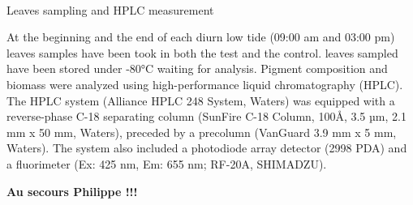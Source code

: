 \documentclass[
  number]{elsarticle}
\makeatletter
\let\oldparagraph\paragraph
\renewcommand{\paragraph}{
    \@ifstar
      \xxxParagraphStar
      \xxxParagraphNoStar
  }
\newcommand{\xxxParagraphStar}[1]{\oldparagraph*{#1}\mbox{}}
\newcommand{\xxxParagraphNoStar}[1]{\oldparagraph{#1}\mbox{}}
\makeatother
\begin{document}
\paragraph{Leaves sampling and HPLC
measurement}\label{leaves-sampling-and-hplc-measurement}

At the beginning and the end of each diurn low tide (09:00 am and 03:00
pm) leaves samples have been took in both the test and the control.
leaves sampled have been stored under -80°C waiting for analysis.
Pigment composition and biomass were analyzed using high-performance
liquid chromatography (HPLC). The HPLC system (Alliance HPLC 248 System,
Waters) was equipped with a reverse-phase C-18 separating column
(SunFire C-18 Column, 100Å, 3.5 µm, 2.1 mm x 50 mm, Waters), preceded by
a precolumn (VanGuard 3.9 mm x 5 mm, Waters). The system also included a
photodiode array detector (2998 PDA) and a fluorimeter (Ex: 425 nm, Em:
655 nm; RF-20A, SHIMADZU).

\textbf{Au secours Philippe !!!}


\renewcommand\refname{Bibliography}
  
\end{document}
